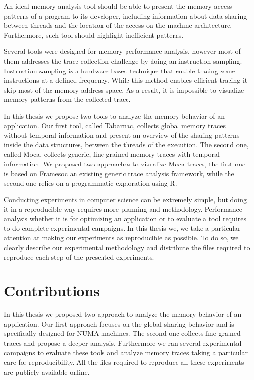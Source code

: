 An ideal memory analysis tool should be able to present the memory access patterns of a program to its developer, including information about data sharing between threads and the location of the access on the machine architecture.
Furthermore, such tool should highlight inefficient patterns.

Several tools were designed for memory performance analysis, however most of them addresses the trace collection challenge by doing an instruction sampling.
Instruction sampling is a hardware based technique that enable tracing some instructions at a defined frequency.
While this method enables efficient tracing it skip most of the memory address space.
As a result, it is impossible to visualize memory patterns from the collected trace.

In this thesis we propose two tools to analyze the memory behavior of an application.
Our first tool, called \gls{Tabarnac}, collects global memory traces without temporal information and present an overview of the sharing patterns inside the data structures, between the threads of the execution.
The second one, called \gls{Moca}, collects generic, fine grained  memory traces with temporal information.
We proposed two approaches to visualize \gls{Moca} traces, the first one is based on \gls{Framesoc} an existing generic trace analysis framework, while the second one relies on a programmatic exploration using \gls{R}.

Conducting experiments in computer science can be extremely simple, but doing it in a reproducible way requires more planning and methodology.
Performance analysis whether it is for optimizing an application or to evaluate a tool requires to do complete experimental campaigns.
In this thesis we, we take a particular attention at making our experiments as reproducible as possible.
To do so, we clearly describe our experimental methodology and distribute the files required to reproduce each step of the presented experiments.

\section{Contributions}

In this thesis we proposed two approach to analyze the memory behavior of an application.
Our first approach focuses on the global sharing behavior and is specifically designed for \gls{NUMA} machines.
The second one collects fine grained traces and propose a deeper analysis.
Furthermore we ran several experimental campaigns to evaluate these tools and analyze memory traces taking a particular care for reproducibility.
All the files required to reproduce all these experiments are publicly available online.

